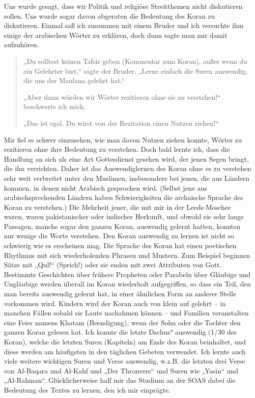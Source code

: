 \documentclass[12pt]{memoir}
\def\´{ʾ} %
\begin{document}
Uns wurde gesagt, dass wir Politik und religiöse Streitthemen
nicht diskutieren sollen.
Uns wurde sogar davon abgeraten die Bedeutung des Koran zu diskutieren.
Einmal saß ich zusammen mit einem Bruder und ich versuchte ihm einige
der arabischen Wörter zu erklären, doch dann sagte man mir damit aufzuhören.

\begin{quote}
„Du solltest keinen Tafsir geben (Kommentar zum Koran),
außer wenn du ein Gelehrter bist,“ sagte der Bruder.
„Lerne einfach die Suren auswendig, die uns der Maulana gelehrt hat.“

„Aber dann würden wir Wörter rezitieren ohne sie zu verstehen!“
beschwerte ich mich.

„Das ist egal. Du wirst von der Rezitation einen Nutzen ziehen!“
\end{quote}

Mir fiel es schwer einzusehen, wie man davon Nutzen ziehen konnte,
Wörter zu rezitieren ohne ihre Bedeutung zu verstehen.
Doch bald lernte ich, dass die Handlung an sich
als eine Art Gottesdienst gesehen wird,
der jenen Segen bringt, die ihn verrichten.
Daher ist das Auswendiglernen des Koran ohne es zu verstehen
sehr weit verbreitet unter den Muslimen, insbesondere bei jenen,
die aus Ländern kommen, in denen nicht Arabisch gesprochen wird.
(Selbst jene aus arabischsprechenden Ländern haben Schwierigkeiten
die archaische Sprache des Koran zu verstehen.)
Die Mehrheit jener, die mit mir in der Leeds-Moschee waren,
waren pakistanischer oder indischer Herkunft,
und obwohl sie sehr lange Passagen, manche sogar den ganzen Koran,
auswendig gelernt hatten, konnten nur wenige die Worte verstehen.
Den Koran auswendig zu lernen ist nicht so schwierig wie es erscheinen mag.
Die Sprache des Koran hat einen poetischen Rhythmus
mit sich wiederholenden Phrasen und Mustern.
Zum Beispiel beginnen Sätze mit „Qul!“ (Sprich!)
oder sie enden mit zwei Attributen von Gott.
Bestimmte Geschichten über frühere Propheten oder Parabeln
über Gläubige und Ungläubige werden überall im Koran wiederholt aufgegriffen,
so dass ein Teil, den man  bereits auswendig gelernt hat,
in einer ähnlichen Form an anderer Stelle vorkommen wird.
Kindern wird der Koran auch von klein auf gelehrt –
in manchen Fällen sobald sie Laute nachahmen können –
und Familien veranstalten eine Feier namens Khatam (Beendigung),
wenn der Sohn oder die Tochter den ganzen Koran gelesen hat.
Ich konnte die letzte Dschuz\´ auswendig (1/30 des Koran),
welche die letzten Suren (Kapiteln) am Ende des Koran beinhaltet,
und diese werden am häufigsten in den täglichen Gebeten verwendet.
Ich lernte auch viele weitere wichtigen Suren und Verse auswendig,
w.z.B. die letzten drei Verse von Al-Baqara und Al-Kahf und „Der Thronvers“
und Suren wie „Yasin“ und „Al-Rahman“.
Glücklicherweise half mir das Studium an der SOAS dabei
die Bedeutung des Textes zu lernen, den ich mir einprägte.
\end{document}
